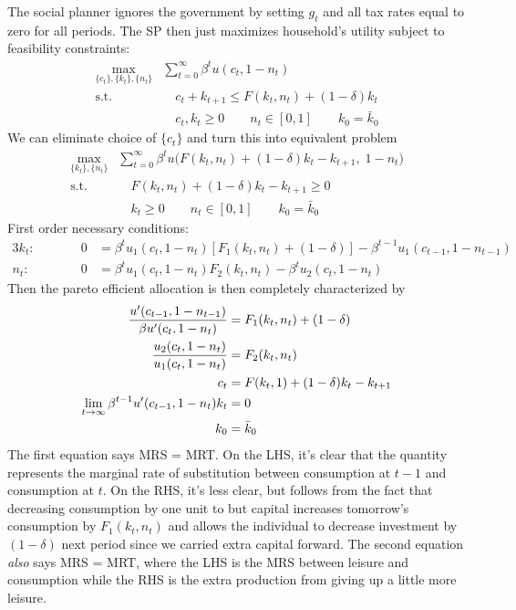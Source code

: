 \documentclass[12pt]{article}
\theoremstyle{plain}
\theoremstyle{definition}
\theoremstyle{remark}
\newcommand{\limt}{\lim_{t\rightarrow\infty}}
\newcommand{\sumtinfz}{\sum^\infty_{t=0}}
\begin{document}
The social planner ignores the government by setting $g_t$ and all tax
rates equal to zero for all periods. The SP then just maximizes
household's utility subject to feasibility constraints:
\begin{align*}
  \max_{\{c_t\},\{k_t\},\{n_t\}}
    &\sumtinfz \beta^t u(c_t,1-n_t) \\
    \text{s.t.} &\quad
    c_t + k_{t+1}
    \leq F(k_t,n_t) + (1-\delta) k_t\\
    &\quad c_t, k_t \geq 0
    \qquad n_t\in[0,1]
    \qquad k_0 = \bar{k}_0
\end{align*}
We can eliminate choice of $\{c_t\}$ and turn this into equivalent
problem
\begin{align*}
  \max_{\{k_t\},\{n_t\}}
    &\sumtinfz \beta^t
      u\big(F(k_t,n_t) + (1-\delta) k_t - k_{t+1}, \;1-n_t\big) \\
    \text{s.t.} &\quad
    F(k_t,n_t) + (1-\delta) k_t - k_{t+1} \geq 0 \\
    & \quad k_t \geq 0 \qquad n_t \in[0,1] \qquad
    k_0 = \bar{k}_0
\end{align*}
First order necessary conditions:
\begin{alignat*}{3}
  k_t:&&\qquad
  0 &=
  \beta^t u_1(c_t,1-n_t)
  \left[F_1(k_t,n_t)+(1-\delta)\right]
  - \beta^{t-1}u_1(c_{t-1},1-n_{t-1})
  \\
  n_t:&&\qquad
  0
  &=
  \beta^t u_1(c_t,1-n_t)F_2(k_t,n_t) - \beta^t u_2(c_t,1-n_t)
\end{alignat*}
Then the pareto efficient allocation is then completely characterized by
\begin{align}
  \frac{u'(c_{t-1},1-n_{t-1})}{\beta u'(c_{t},1-n_t)}
  &= F_1(k_t,n_t) + (1-\delta) \notag \\
  \frac{u_2(c_t,1-n_t)}{u_1(c_t,1-n_t)} &= F_2(k_t,n_t) \\
  c_t &= F(k_t,1) + (1-\delta)k_t - k_{t+1}\notag\\
  \limt \beta^{t-1}u'(c_{t-1},1-n_t) k_t &= 0 \notag\\
  k_0 &= \bar{k}_0\notag
\end{align}
The first equation says MRS = MRT. On the LHS, it's clear that the
quantity represents the marginal rate of substitution between
consumption at $t-1$ and consumption at $t$. On the RHS, it's less
clear, but follows from the fact that decreasing consumption by one unit
to but capital increases tomorrow's consumption by $F_1(k_t,n_t)$ and
allows the individual to decrease investment by $(1-\delta)$ next period
since we carried extra capital forward.
The second equation \emph{also} says MRS = MRT, where the LHS is the
MRS between leisure and consumption while the RHS is the extra
production from giving up a little more leisure.
\end{document}
